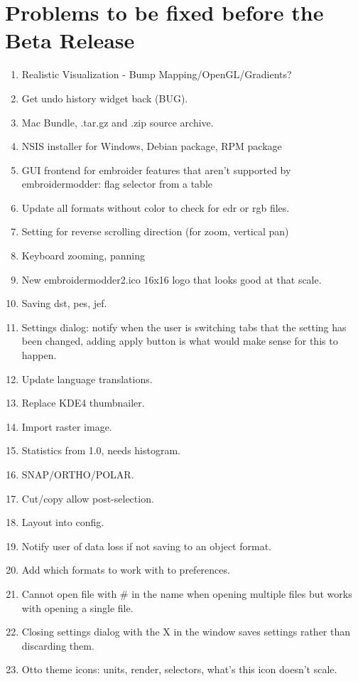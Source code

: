 \section{Problems to be fixed before the Beta Release}

\begin{enumerate}
\item Realistic Visualization - Bump Mapping/OpenGL/Gradients?
\item Get undo history widget back (BUG).
\item Mac Bundle, .tar.gz and .zip source archive.
\item NSIS installer for Windows, Debian package, RPM package
\item GUI frontend for embroider features that aren't supported by embroidermodder: flag selector from a table
\item Update all formats without color to check for edr or rgb files.
\item Setting for reverse scrolling direction (for zoom, vertical pan)
\item Keyboard zooming, panning
\item  New embroidermodder2.ico 16x16 logo that looks good at that scale.
\item Saving dst, pes, jef.
\item Settings dialog: notify when the user is switching tabs that the setting has been changed, adding apply button is what would make sense for this to happen.
\item Update language translations.
\item Replace KDE4 thumbnailer.
\item Import raster image.
\item Statistics from 1.0, needs histogram.
\item SNAP/ORTHO/POLAR.
\item Cut/copy allow post-selection.
\item Layout into config.
\item Notify user of data loss if not saving to an object format.
\item Add which formats to work with to preferences.
\item Cannot open file with \# in the name when opening multiple files but works with opening a single file.
\item Closing settings dialog with the X in the window saves settings rather than discarding them.
\item Otto theme icons: units, render, selectors, what's this icon doesn't scale.

\end{enumerate}
